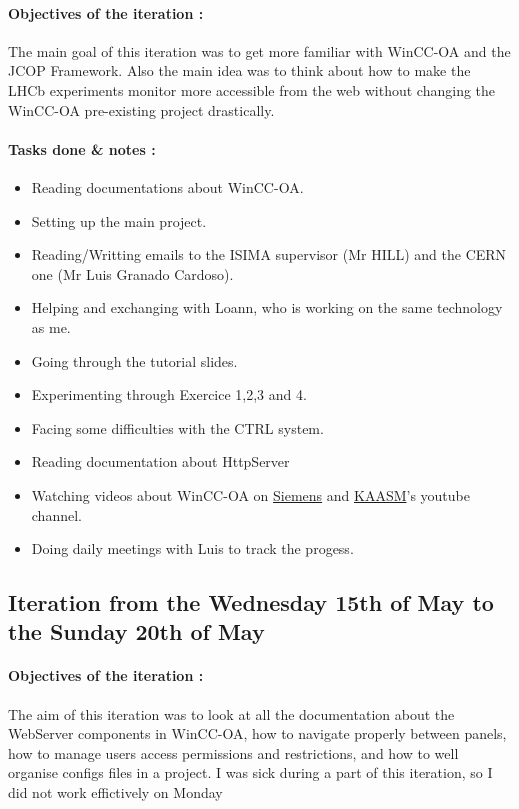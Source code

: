 \documentclass[a4paper, 10pt]{article}
\begin{document}
\paragraph{Objectives of the iteration :} 
The main goal of this iteration was to get more familiar with WinCC-OA and the JCOP Framework. 
Also the main idea was to think about how to make the LHCb experiments monitor more accessible from the web without changing the WinCC-OA pre-existing project drastically.
\paragraph{Tasks done \& notes :}
\begin{itemize}
    \item Reading documentations about WinCC-OA.
    \item Setting up the main project.
    \item Reading/Writting emails to the ISIMA supervisor (Mr HILL) and the CERN one (Mr Luis Granado Cardoso).
    \item Helping and exchanging with Loann, who is working on the same technology as me.
    \item Going through the tutorial slides.
    \item Experimenting through Exercice 1,2,3 and 4.
    \item Facing some difficulties with the CTRL system.
    \item Reading documentation about HttpServer
    \item Watching videos about WinCC-OA on \href{https://www.youtube.com/user/ETM2011}{Siemens} and \href{https://www.youtube.com/channel/UCGBnHd1-B-Zg9MDsjTk0-Sw}{KAASM}'s youtube channel. 
    \item Doing daily meetings with Luis to track the progess.
\end{itemize}

\subsection{Iteration from the Wednesday 15th of May to the Sunday 20th of May}
\paragraph{Objectives of the iteration :}
The aim of this iteration was to look at all the documentation about the WebServer components in WinCC-OA, how to navigate properly between panels, how to manage users access permissions and restrictions, and how to well organise configs files in a project. I was sick during a part of this iteration, so I did not work effictively on Monday
\end{document}
